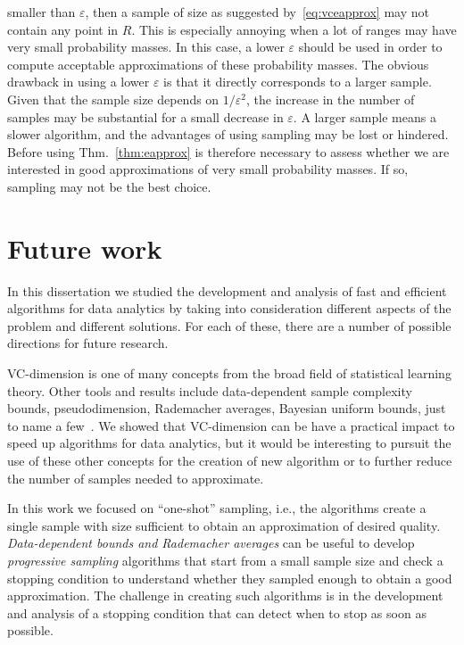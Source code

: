 \begin{itemize}
    smaller than $\varepsilon$, then a sample of size as suggested
    by~\eqref{eq:vceapprox} may not contain any point in $R$. This is especially annoying when a lot
    of ranges may have very small probability masses. In this case, a lower
    $\varepsilon$ should be used in order to compute acceptable approximations
    of these probability masses. The obvious drawback in using a lower
    $\varepsilon$ is that it directly corresponds to a larger sample. Given that
    the sample size depends on $1/\varepsilon^2$, the increase in the number of
    samples may be substantial for a small decrease in $\varepsilon$. A larger
    sample means a slower algorithm, and the advantages of using sampling may be
    lost or hindered. Before using Thm.~\ref{thm:eapprox} is therefore
    necessary to assess whether we are interested in good approximations of very
    small probability masses. If so, sampling may not be the best choice.
\end{itemize}

\section*{Future work} 
In this dissertation we studied the development and analysis of fast and
efficient algorithms for data analytics by taking into consideration different
aspects of the problem and different solutions. For each of these, there are a
number of possible directions for future research.

VC-dimension is one of many concepts from the broad field of statistical
learning theory. Other tools and results include data-dependent sample
complexity bounds, pseudodimension, Rademacher averages, Bayesian uniform
bounds, just to name a few~\citep{BoucheronBL05,AnthonyB99,DevroyeGL96}. We
showed that VC-dimension can be have a practical impact to speed up algorithms
for data analytics, but it would be interesting to pursuit the use of these
other concepts for the creation of new algorithm or to further reduce the number
of samples needed to approximate. 

In this work we focused on ``one-shot'' sampling, i.e., the algorithms create a
single sample with size sufficient to obtain an approximation of desired
quality. \emph{Data-dependent bounds and Rademacher averages} can be
useful to develop \emph{progressive sampling} algorithms that start from a small
sample size and check a stopping condition to understand whether they sampled
enough to obtain a good approximation. The challenge in creating such algorithms
is in the development and analysis of a stopping condition that can detect when
to stop as soon as possible.  

